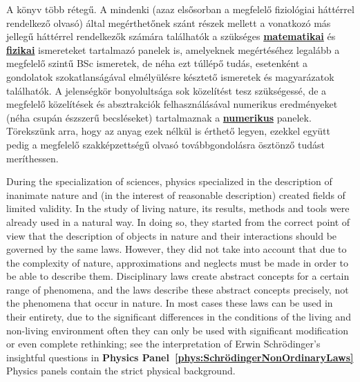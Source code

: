 \else

A könyv több rétegű. A mindenki (azaz elsősorban a megfelelő
fiziológiai háttérrel rendelkező olvasó)
által megérthetőnek szánt részek mellett a vonatkozó más jellegű háttérrel rendelkezők számára találhatók 
a szükséges
\textbf{\hyperlink{intro:MyMathematicsPanel}{matematikai}} és
\textbf{\hyperlink{intro:MyPhysicsPanel}{fizikai}}
ismereteket tartalmazó panelek is, amelyeknek megértéséhez legalább a megfelelő szintű BSc ismeretek, de néha ezt túllépő tudás, esetenként 
a gondolatok szokatlanságával elmélyülésre késztető 
ismeretek és magyarázatok találhatók.
A jelenségkör bonyolultsága sok közelítést tesz szükségessé,
de a megfelelő közelítések és absztrakciók felhasználásával 
numerikus eredményeket (néha csupán észszerű becsléseket)
tartalmaznak a \textbf{\hyperlink{num:MyNumericsPanel}{numerikus}} panelek.
Törekszünk arra, hogy az anyag ezek nélkül is érthető legyen,
ezekkel együtt pedig a megfelelő szakképzettségű olvasó
továbbgondolásra ösztönző tudást meríthessen.

\fi




\ifx\magyar\undefined

{

During the specialization of sciences, physics specialized in the description of inanimate nature and (in the interest of reasonable description) created fields of limited validity. In the study of living nature, its results, methods and tools were already used in a natural way. In doing so, they started from the correct point of view that the description of objects in nature and their interactions should be governed by the same laws. However, they did not take into account that due to the complexity of nature, approximations and neglects must be made in order to be able to describe them. Disciplinary laws create abstract concepts for a certain range of phenomena, and the laws describe these abstract concepts precisely, not the phenomena that occur in nature. In most cases
these laws can be used in their entirety,
due to the significant differences in the conditions of the living and non-living environment
often they can only be used with significant modification or even complete rethinking; see the interpretation of Erwin Schrödinger's insightful questions
in \textbf{Physics Panel~\ref{phys:SchrödingerNonOrdinaryLaws}}
Physics panels contain the strict physical background.
}

\else

